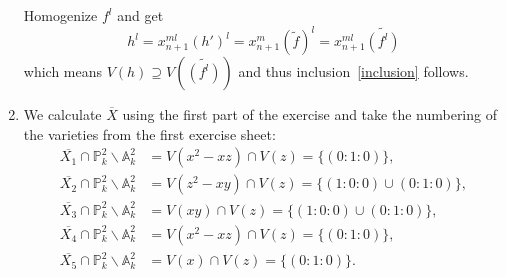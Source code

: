 \begin{exercise}{1}
\begin{enumerate}
            Homogenize $f^l$ and get
            \[
                h^l = x^{ml}_{n+1} (h')^l = x^m_{n+1} (\widetilde{f})^l = 
                x^{ml}_{n+1} \widetilde{(f^l)}
            \]
            which means $V(h) \supseteq V\left(\widetilde{(f^l)}\right)$ and thus
            inclusion~\ref{inclusion} follows.




        \item{} We calculate $\overline{X}$ using the first part of the exercise and take the numbering of the
        varieties from the first exercise sheet:\\
        \begin{align*}
            \overline{X_1}\cap \mathbb{P}^2_k \backslash
            \mathbb{A}^2_k&=V(x^2-xz)\cap V(z)=\{(0:1:0)\},\\
            \overline{X_2}\cap \mathbb{P}^2_k \backslash
            \mathbb{A}^2_k&=V(z^2-xy)\cap V(z)=\{(1:0:0) \cup (0:1:0)\},\\
            \overline{X_3}\cap \mathbb{P}^2_k \backslash
            \mathbb{A}^2_k&=V(xy)\cap V(z)=\{(1:0:0) \cup (0:1:0)\},\\
            \overline{X_4}\cap \mathbb{P}^2_k \backslash
            \mathbb{A}^2_k&=V(x^2-xz)\cap V(z)=\{(0:1:0)\},\\
            \overline{X_5}\cap \mathbb{P}^2_k \backslash
            \mathbb{A}^2_k&=V(x)\cap V(z)= \{(0:1:0)\}.
        \end{align*}


\end{enumerate}
\end{exercise}
